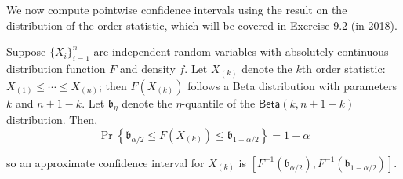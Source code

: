 \documentclass[]{book}
\theoremstyle{definition}
\theoremstyle{definition}
\theoremstyle{definition}
\theoremstyle{remark}
\begin{document}
We now compute pointwise confidence intervals using the
result on the distribution of the order statistic, which will be covered in Exercise 9.2 (in 2018).

Suppose \(\{X_i\}_{i=1}^n\) are independent random variables with absolutely continuous distribution function \(F\) and density \(f\).
Let \(X_{(k)}\) denote the \(k\)th order statistic: \(X_{(1)} \leq \cdots \leq X_{(n)}\); then \(F(X_{(k)})\) follows a Beta distribution with parameters \(k\) and \(n + 1 - k\). Let \(\mathfrak{b}_{\eta}\) denote the \(\eta\)-quantile of the \(\mathsf{Beta}(k, n+1-k)\) distribution. Then,
\[\Pr\left\{\mathfrak{b}_{\alpha/2} \leq  F(X_{(k)}) \leq \mathfrak{b}_{1-\alpha/2}\right\} = 1-\alpha\]

so an approximate confidence interval for \(X_{(k)}\) is \([F^{-1}(\mathfrak{b}_{\alpha/2}), F^{-1}(\mathfrak{b}_{1-\alpha/2})]\).
\end{document}
